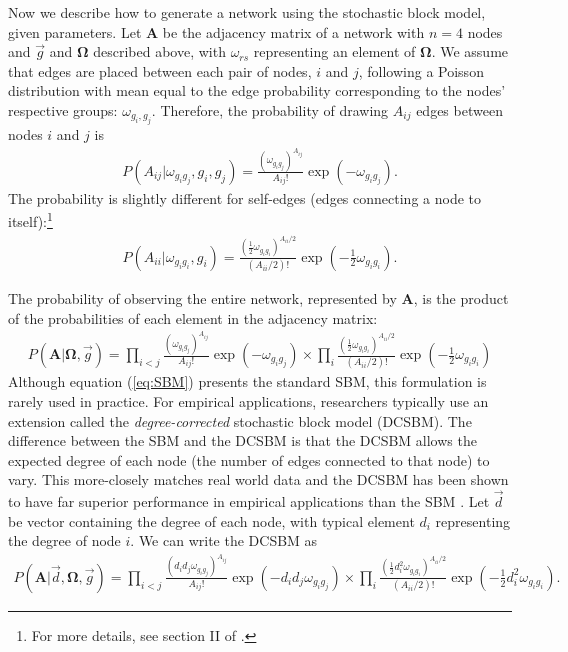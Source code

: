 \documentclass[12pt]{article}
\theoremstyle{definition}
\theoremstyle{plain}
\begin{document}
Now we describe how to generate a network using the stochastic block model, given parameters. Let $\mathbf{A}$ be the adjacency matrix of a network with $n=4$ nodes and $\vec{g}$ and $\mathbf{\Omega}$ described above, with $\omega_{rs}$ representing an element of $\mathbf{\Omega}$. We assume that edges are placed between each pair of nodes, $i$ and $j$, following a Poisson distribution with mean equal to the edge probability corresponding to the nodes' respective groups: $\omega_{g_i,g_j}$. Therefore, the probability of drawing $A_{ij}$ edges between nodes $i$ and $j$ is
\begin{align*}
P(A_{ij}|\omega_{g_ig_j}, g_i, g_j) = \frac{(\omega_{g_ig_j})^{A_{ij}}}{A_{ij}!} \exp \left( -\omega_{g_ig_j}\right). 
\end{align*}
The probability is slightly different for self-edges (edges connecting a node to itself):\footnote{For more details, see section II of \citet{KarrerNewman2011}.}
\begin{align*}
P(A_{ii}|\omega_{g_ig_i}, g_i) = \frac{(\frac{1}{2}\omega_{g_ig_i})^{A_{ii}/2}}{(A_{ii}/2)!} \exp \left( -\frac{1}{2}\omega_{g_ig_i}\right). 
\end{align*}

The probability of observing the entire network, represented by $\mathbf{A}$, is the product of the probabilities of each element in the adjacency matrix:
\begin{align}
P(\mathbf{A}|\mathbf{\Omega}, \vec{g}) = \prod_{i < j} \frac{(\omega_{g_ig_j})^{A_{ij}}}{A_{ij}!} \exp \left( -\omega_{g_ig_j}\right) \times \prod_i \frac{(\frac{1}{2}\omega_{g_ig_i})^{A_{ii}/2}}{(A_{ii}/2)!} \exp \left( -\frac{1}{2}\omega_{g_ig_i}\right) \label{eq:SBM}
\end{align}
Although equation (\ref{eq:SBM}) presents the standard SBM, this formulation is rarely used in practice. For empirical applications, researchers typically use an extension called the \emph{degree-corrected} stochastic block model (DCSBM). The difference between the SBM and the DCSBM is that the DCSBM allows the expected degree of each node (the number of edges connected to that node) to vary. This more-closely matches real world data and the DCSBM has been shown to have far superior performance in empirical applications than the SBM \citep{KarrerNewman2011}. Let $\vec{d}$ be vector containing the degree of each node, with typical element $d_i$ representing the degree of node $i$. We can write the DCSBM as 
\begin{align}
P(\mathbf{A}|\vec{d}, \mathbf{\Omega}, \vec{g}) = \prod_{i < j} \frac{(d_id_j\omega_{g_ig_j})^{A_{ij}}}{A_{ij}!} \exp \left( -d_id_j\omega_{g_ig_j}\right) \times \prod_i \frac{(\frac{1}{2}d_i^2\omega_{g_ig_i})^{A_{ii}/2}}{(A_{ii}/2)!} \exp \left( -\frac{1}{2}d_i^2\omega_{g_ig_i}\right). \label{eq:DCSBM}
\end{align}
\end{document}
